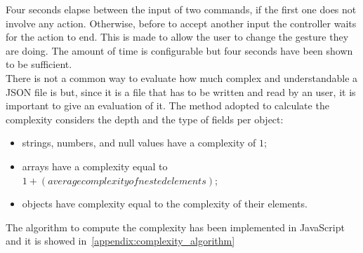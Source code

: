 \documentclass[../thesis.tex]{subfiles}
\begin{document}
Four seconds elapse between the input of two commands, if the first one does not involve any action. Otherwise, before to accept another input the controller waits for the action to end. This is made to allow the user to change the gesture they are doing. The amount of time is configurable but four seconds have been shown to be sufficient.\\

There is not a common way to evaluate how much complex and understandable a JSON file is but, since it is a file that has to be written and read by an user, it is important to give an evaluation of it. The method adopted to calculate the complexity considers the depth and the type of fields per object: 
\begin{itemize}
    \item strings, numbers, and null values have a complexity of $1$;
    \item arrays have a complexity equal to $1 + (average complexity of nested elements)$;
    \item objects have complexity equal to the complexity of their elements.
\end{itemize}
The algorithm to compute the complexity has been implemented in JavaScript and it is showed in~\ref{appendix:complexity_algorithm}
\end{document}
